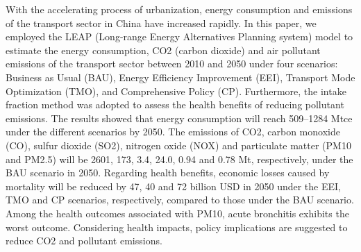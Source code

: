 With the accelerating process of urbanization, energy consumption and emissions of the transport sector in China have increased rapidly. In this paper, we employed the LEAP (Long-range Energy Alternatives Planning system) model to estimate the energy consumption, CO2 (carbon dioxide) and air pollutant emissions of the transport sector between 2010 and 2050 under four scenarios: Business as Usual (BAU), Energy Efficiency Improvement (EEI), Transport Mode Optimization (TMO), and Comprehensive Policy (CP). Furthermore, the intake fraction method was adopted to assess the health benefits of reducing pollutant emissions. The results showed that energy consumption will reach 509–1284 Mtce under the different scenarios by 2050. The emissions of CO2, carbon monoxide (CO), sulfur dioxide (SO2), nitrogen oxide (NOX) and particulate matter (PM10 and PM2.5) will be 2601, 173, 3.4, 24.0, 0.94 and 0.78 Mt, respectively, under the BAU scenario in 2050. Regarding health benefits, economic losses caused by mortality will be reduced by 47, 40 and 72 billion USD in 2050 under the EEI, TMO and CP scenarios, respectively, compared to those under the BAU scenario. Among the health outcomes associated with PM10, acute bronchitis exhibits the worst outcome. Considering health impacts, policy implications are suggested to reduce CO2 and pollutant emissions.
